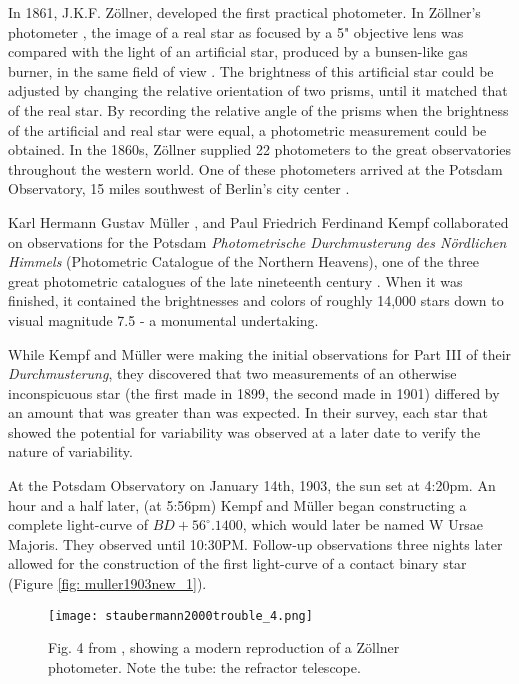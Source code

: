 \documentclass[12pt]{article} %
\numberwithin{equation}{section} %
\begin{document}
In 1861, J.K.F. Z\"ollner, developed the first practical photometer. In Z\"ollner's photometer , the image of a real star as focused by a 5" objective lens was compared with the light of an artificial star, produced by a bunsen-like gas burner, in the same field of view \citep{staubermann2000trouble}. The brightness of this artificial star could be adjusted by changing the relative orientation of two prisms, until it matched that of the real star. By recording the relative angle of the prisms when the brightness of the artificial and real star were equal, a photometric measurement could be obtained. In the 1860s, Z\"ollner supplied 22 photometers to the great observatories throughout the western world. One of these photometers arrived at the Potsdam Observatory, 15 miles southwest of Berlin's city center \citep{krisciunas2001brief}.

Karl Hermann Gustav M\"uller , and Paul Friedrich Ferdinand Kempf  collaborated on observations for the Potsdam \emph{Photometrische Durchmusterung des N\"ordlichen Himmels} (Photometric Catalogue of the Northern Heavens), one of the three great photometric catalogues of the late nineteenth century \citep{bolt2007biographical}. When it was finished, it contained the brightnesses and colors of roughly 14,000 stars down to visual magnitude 7.5 - a monumental undertaking.

While Kempf and M\"uller were making the initial observations for Part III of their \emph{Durchmusterung}, they discovered that two measurements of an otherwise inconspicuous star (the first made in 1899, the second made in 1901) differed by an amount that was greater than was expected. In their survey, each star that showed the potential for variability was observed at a later date to verify the nature of variability.

At the Potsdam Observatory on January 14th, 1903, the sun set at 4:20pm. An hour and a half later, (at 5:56pm) Kempf and M\"uller began constructing a complete light-curve of $BD +56^{\circ}.1400$, which would later be named W Ursae Majoris. They observed until 10:30PM. Follow-up observations three nights later allowed for the construction of the first light-curve of a contact binary star (Figure \ref{fig: muller1903new_1}).

\begin{figure}[H]
\centering
\texttt{[image: staubermann2000trouble\_4.png]}
\caption{Fig. 4 from \citet{staubermann2000trouble}, showing a modern reproduction of a Z\"ollner photometer. Note the tube: the refractor telescope.}
\label{fig: staubermann2000trouble_4}
\end{figure}
\end{document}
